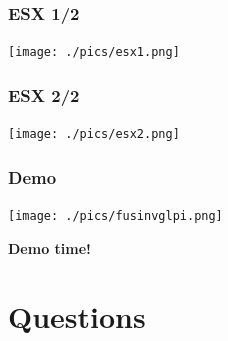 \documentclass{beamer}
\begin{document}
\begin{frame}
\frametitle{ESX 1/2}


   \texttt{[image: ./pics/esx1.png]}
\end{frame}
%
\begin{frame}
\frametitle{ESX 2/2}


   \texttt{[image: ./pics/esx2.png]}
\end{frame}

%
%




\begin{frame}
    \frametitle{Demo}

   \texttt{[image: ./pics/fusinvglpi.png]}

    \bf{Demo time!}
\end{frame}


\section{Questions}
\end{document}
